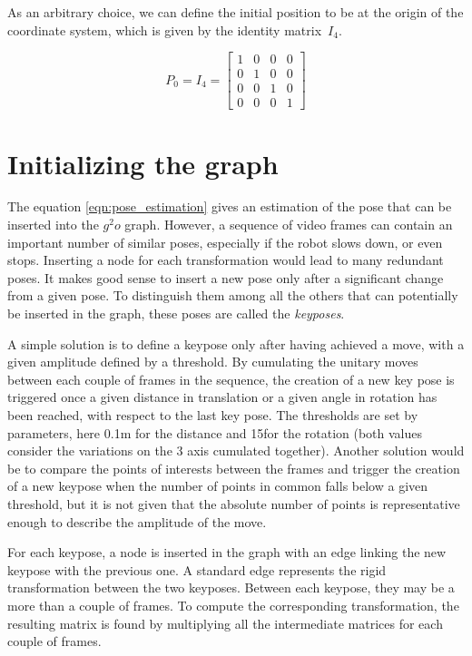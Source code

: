 As an arbitrary choice, we can define the initial position to be at the origin of the coordinate system, which is given by the identity matrix~$I_4$.

\[
P_0 = I_4 = \left[ \begin{array}{cccc}
1 & 0 & 0 & 0 \\
0 & 1 & 0 & 0 \\
0 & 0 & 1 & 0 \\
0 & 0 & 0 & 1 \end{array} \right] 
\]

\section{Initializing the graph}

The equation \ref{eqn:pose_estimation} gives an estimation of the pose that can be inserted into the $g^2o$ graph. However, a sequence of video frames can contain an important number of similar poses, especially if the robot slows down, or even stops. Inserting a node for each transformation would lead to many redundant poses. It makes good sense to insert a new pose only after a significant change from a given pose. To distinguish them among all the others that can potentially be inserted in the graph, these poses are called the \emph{keyposes}. 

A simple solution is to define a keypose only after having achieved a move, with a given amplitude defined by a threshold. By cumulating the unitary moves between each couple of frames in the sequence, the creation of a new key pose is triggered once a given distance in translation or a given angle in rotation has been reached,  with respect to the last key pose. The thresholds are set by parameters, here 0.1m for the distance and 15\textdegree  for the rotation (both values consider the variations on the 3 axis cumulated together). Another solution would be to compare the points of interests between the frames and trigger the creation of a new keypose when the number of points in common falls below a given threshold, but it is not given that the absolute number of points is representative enough to describe the amplitude of the move.

For each keypose, a node is inserted in the graph with an edge linking the new keypose with the previous one. A standard edge represents the rigid transformation between the two keyposes. Between each keypose, they may be a more than a couple of frames. To compute the corresponding transformation, the resulting matrix is found by multiplying all the intermediate matrices for each couple of frames.

